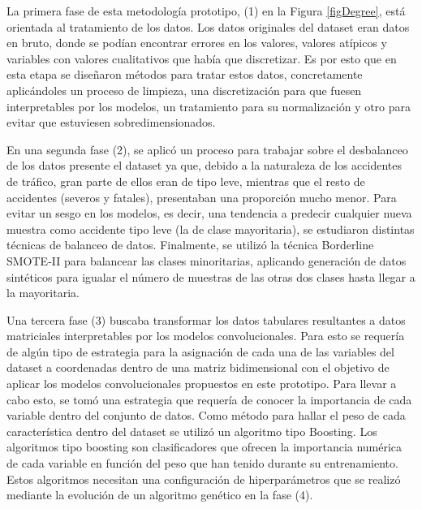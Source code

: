 La primera fase de esta metodología prototipo, (1) en la Figura \ref{figDegree}, está orientada al tratamiento de los datos. Los datos originales del dataset eran datos en bruto, donde se podían encontrar errores en los valores, valores atípicos y variables con valores cualitativos que había que discretizar. Es por esto que en esta etapa se diseñaron métodos para tratar estos datos, concretamente aplicándoles un proceso de limpieza, una discretización para que fuesen interpretables por los modelos, un tratamiento para su normalización y otro para evitar que estuviesen sobredimensionados.

En una segunda fase (2), se aplicó un proceso para trabajar sobre el desbalanceo de los datos presente el dataset ya que, debido a la naturaleza de los accidentes de tráfico, gran parte de ellos eran de tipo leve, mientras que el resto de accidentes (severos y fatales), presentaban una proporción mucho menor. Para evitar un sesgo en los modelos, es decir, una tendencia a predecir cualquier nueva muestra como accidente tipo leve (la de clase mayoritaria), se estudiaron distintas técnicas de balanceo de datos. Finalmente, se utilizó la técnica Borderline SMOTE-II para balancear las clases minoritarias, aplicando generación de datos sintéticos para igualar el número de muestras de las otras dos clases hasta llegar a la mayoritaria.

Una tercera fase (3) buscaba transformar los datos tabulares resultantes a datos matriciales interpretables por los modelos convolucionales. Para esto se requería de algún tipo de estrategia para la asignación de cada una de las variables del dataset a coordenadas dentro de una matriz bidimensional con el objetivo de aplicar los modelos convolucionales propuestos en este prototipo. Para llevar a cabo esto, se tomó una estrategia que requería de conocer la importancia de cada variable dentro del conjunto de datos. Como método para hallar el peso de cada característica dentro del dataset se utilizó un algoritmo tipo Boosting. Los algoritmos tipo boosting son clasificadores que ofrecen la importancia numérica de cada variable en función del peso que han tenido durante su entrenamiento. Estos algoritmos necesitan una configuración de hiperparámetros que se realizó mediante la evolución de un algoritmo genético en la fase (4).

